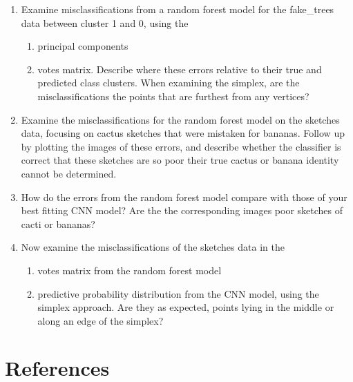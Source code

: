 \documentclass[
  letterpaper,
]{krantz}
\providecommand{\tightlist}{%
  \setlength{\itemsep}{0pt}\setlength{\parskip}{0pt}}\usepackage{longtable,booktabs,array}
\begin{document}
\begin{enumerate}
\def\labelenumi{\arabic{enumi}.}
\tightlist
\item
  Examine misclassifications from a random forest model for the
  fake\_trees data between cluster 1 and 0, using the

  \begin{enumerate}
  \def\labelenumii{\alph{enumii}.}
  \tightlist
  \item
    principal components
  \item
    votes matrix. Describe where these errors relative to their true and
    predicted class clusters. When examining the simplex, are the
    misclassifications the points that are furthest from any vertices?
  \end{enumerate}
\item
  Examine the misclassifications for the random forest model on the
  sketches data, focusing on cactus sketches that were mistaken for
  bananas. Follow up by plotting the images of these errors, and
  describe whether the classifier is correct that these sketches are so
  poor their true cactus or banana identity cannot be determined.
\item
  How do the errors from the random forest model compare with those of
  your best fitting CNN model? Are the the corresponding images poor
  sketches of cacti or bananas?
\item
  Now examine the misclassifications of the sketches data in the

  \begin{enumerate}
  \def\labelenumii{\alph{enumii}.}
  \tightlist
  \item
    votes matrix from the random forest model
  \item
    predictive probability distribution from the CNN model, using the
    simplex approach. Are they as expected, points lying in the middle
    or along an edge of the simplex?
  \end{enumerate}
\end{enumerate}


\chapter*{References}\label{references}

\end{document}
